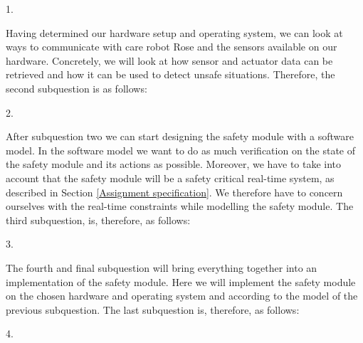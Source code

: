 \documentclass[12pt]{scrreprt}
\begin{document}
\begin{flushleft}
1. \textit{\sqone}
\end{flushleft}

%

Having determined our hardware setup and operating system, we can look at ways to communicate with care robot Rose and the sensors available on our hardware. Concretely, we will look at how sensor and actuator data can be retrieved and how it can be used to detect unsafe situations. Therefore, the second subquestion is as follows:

\begin{flushleft}
2. \textit{\sqtwo}
\end{flushleft}

After subquestion two we can start designing the safety module with a software model. In the software model we want to do as much verification on the state of the safety module and its actions as possible. Moreover, we have to take into account that the safety module will be a safety critical real-time system, as described in Section \ref{Assignment specification}.
We therefore have to concern ourselves with the real-time constraints while modelling the safety module. The third subquestion, is, therefore, as follows:

\begin{flushleft}
3. \textit{\sqthree}
\end{flushleft}

The fourth and final subquestion will bring everything together into an implementation of the safety module. Here we will implement the safety module on the chosen hardware and operating system and according to the model of the previous subquestion. The last subquestion is, therefore, as follows:

\begin{flushleft}
4. \textit{\sqfour}
\end{flushleft}

\end{document}
